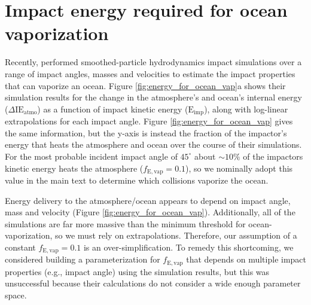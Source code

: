 \documentclass[manuscript]{aastex63}
\begin{document}
\section{Impact energy required for ocean vaporization} \label{sec:append_vap}

Recently, \citet{Citron_2022} performed smoothed-particle hydrodynamics impact simulations over a range of impact angles, masses and velocities to estimate the impact properties that can vaporize an ocean. Figure \ref{fig:energy_for_ocean_vap}a shows their simulation results for the change in the atmosphere's and ocean's internal energy ($\Delta \mathrm{IE}_\mathrm{atmo}$) as a function of impact kinetic energy ($\mathrm{E}_\mathrm{imp}$), along with log-linear extrapolations for each impact angle. Figure \ref{fig:energy_for_ocean_vap} gives the same information, but the y-axis is instead the fraction of the impactor's energy that heats the atmosphere and ocean over the course of their simulations. For the most probable incident impact angle of $45^\circ$ about $\sim 10\%$ of the impactors kinetic energy heats the atmosphere ($f_\mathrm{E,vap} = 0.1$), so we nominally adopt this value in the main text to determine which collisions vaporize the ocean.

Energy delivery to the atmosphere/ocean appears to depend on impact angle, mass and velocity (Figure \ref{fig:energy_for_ocean_vap}). Additionally, all of the \citet{Citron_2022} simulations are far more massive than the minimum threshold for ocean-vaporization, so we must rely on extrapolations. Therefore, our assumption of a constant $f_\mathrm{E,vap} = 0.1$ is an over-simplification. To remedy this shortcoming, we considered building a parameterization for $f_\mathrm{E,vap}$ that depends on multiple impact properties (e.g., impact angle) using the \citet{Citron_2022} simulation results, but this was unsuccessful because their calculations do not consider a wide enough parameter space.
\end{document}
